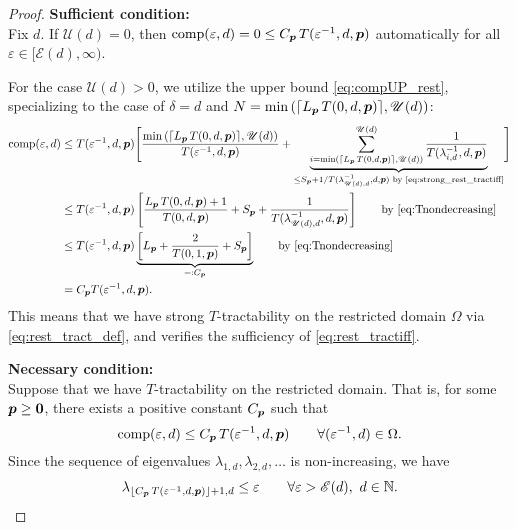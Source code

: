 \documentclass[sort&compress]{elsarticle}
\newcommand{\thed}{\delta}
\newcommand{\theM}{\mathscr{E}}
\newcommand{\theUB}{\mathscr{U}}
\newcommand{\peter}[1]{\begingroup\color{purple}#1\endgroup}
\begin{document}
\begin{proof}
    \textbf{Sufficient condition:}\\
Fix $d$.  If $\theUB(d) = 0$, then $\operatorname{comp}(\varepsilon,d) = 0 \le C_{\boldsymbol{p}}\, T(\varepsilon^{-1},d,\boldsymbol{p})$ automatically for all $\varepsilon \in [\theM(d), \infty)$.

For the case $\theUB(d)> 0$, we utilize \peter{the} upper bound \eqref{eq:compUP_rest}, specializing to the case of $\thed=d$ and $N = \min\left(\lceil L_{\vp}\, T(0,d,\vp)\rceil,\theUB(d)\right)$:
\begin{align*}
       \comp(\varepsilon,d)
       & \le T(\varepsilon^{-1},d, \vp) \Biggl [ \frac{\min\left(\lceil L_{\vp}\, T(0,d,\vp)\rceil,\theUB(d)\right)}{T(\varepsilon^{-1},d, \vp)}  + \underbrace{\sum_{i = \min\left(\lceil L_{\vp}\, T(0,d,\vp)\rceil,\theUB(d)\right)}^{\theUB(d)} \frac{1}{T(\lambda_{i, d}^{-1},d,\vp)}}_{\le S_{\vp} + 1/ T(\lambda_{\theUB(d), d}^{-1},d,\vp) \text{ by \eqref{eq:strong_rest_tractiff}} }
        \Biggr] \\
       & \le T(\varepsilon^{-1},d,\vp)\left[\frac{ L_{\vp}\, T(0,d,\vp)+1}{T(0,d, \vp)} + S_{\vp} + \frac{1}{T(\lambda_{\theUB(d), d}^{-1},d,\vp)} \right]
       \qquad \text{by \eqref{eq:Tnondecreasing}}\\
       & \le T(\varepsilon^{-1},d,\vp) \underbrace{\left[L_{\vp} + \frac{2}{T(0,1, \vp)} + S_{\vp} \right]}_{=:C_{\vp}}
       \qquad \text{by \eqref{eq:Tnondecreasing}}\\
       & =  C_{\vp}T(\varepsilon^{-1},d,\vp).
\end{align*}
This means that we have strong $T$-tractability on the restricted domain $\Omega$ via \eqref{eq:rest_tract_def}, and verifies the sufficiency of \eqref{eq:rest_tractiff}.


\bigskip

\noindent \textbf{Necessary condition:}\\
Suppose that we have
$T$-tractability on the restricted domain. That is, for some $\boldsymbol{p} \ge \boldsymbol{0}$, there exists a positive constant $C_{\boldsymbol{p}}$ such that
\[
\operatorname{comp}(\varepsilon,d)\le C_{\boldsymbol{p}}\, T(\varepsilon^{-1},d,\boldsymbol{p}) \qquad \forall (\varepsilon^{-1}, d) \in \Omega.
\]
Since the sequence of eigenvalues $\lambda_{1,d}, \lambda_{2,d}, \ldots $ is non-increasing, we have
\begin{equation}\label{eq:rest_lambda_K4}
	\lambda_{\lfloor C_{\vp}\, T(\varepsilon^{-1},d,\vp)\rfloor +1,d}\le \varepsilon \qquad 
 \forall \varepsilon > \theM(d),\ d \in \naturals.
\end{equation}


\end{proof}
\end{document}
